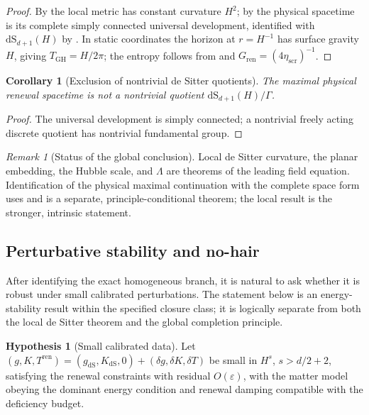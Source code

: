 \documentclass[11pt]{article}
\newtheorem{corollary}[theorem]{Corollary}
\theoremstyle{definition}
\newtheorem{hypothesis}[theorem]{Hypothesis}
\theoremstyle{remark}
\newtheorem{remark}[theorem]{Remark}
\newcommand{\eps}{\varepsilon}
\newcommand{\dS}{\mathrm{dS}}
\newcommand{\Tren}{T^{\mathrm{ren}}}
\newcommand{\GH}{\mathrm{GH}}
\newcommand{\etaScr}{\eta_{\mathrm{scr}}}
\newcommand{\Gren}{G_{\mathrm{ren}}}
\begin{document}
\begin{proof}
By  the local metric has constant
curvature $H^2$; by  the physical
spacetime is its complete simply connected universal development, identified with
$\dS_{d+1}(H)$ by .  In static coordinates the
horizon at $r=H^{-1}$ has surface gravity $H$, giving $T_{\GH}=H/2\pi$; the entropy
follows from  and $\Gren=(4\etaScr)^{-1}$.
\end{proof}

\begin{corollary}[Exclusion of nontrivial de Sitter quotients]
\label{cor:exclude-desitter-quotients}
The maximal physical renewal spacetime is not a nontrivial quotient
$\dS_{d+1}(H)/\Gamma$.
\end{corollary}

\begin{proof}
The universal development is simply connected; a nontrivial freely acting discrete
quotient has nontrivial fundamental group.
\end{proof}

\begin{remark}[Status of the global conclusion]
\label{rem:global-desitter-status}
Local de Sitter curvature, the planar embedding, the Hubble scale, and $\Lambda$
are theorems of the leading field equation.  Identification of the physical
maximal continuation with the complete space form uses
 and is a separate, principle-conditional
theorem; the local result is the stronger, intrinsic statement.
\end{remark}

\subsection{Perturbative stability and no-hair}

After identifying the exact homogeneous branch, it is natural to ask whether it
is robust under small calibrated perturbations.  The statement below is an
energy-stability result within the specified closure class; it is logically
separate from both the local de Sitter theorem and the global completion
principle.

\begin{hypothesis}[Small calibrated data]
\label{hyp:small-data}
Let $(g,K,\Tren)=(g_{\dS},K_{\dS},0)+(\delta g,\delta K,\delta T)$ be small in
$H^s$, $s>d/2+2$, satisfying the renewal constraints with residual $O(\eps)$, with
the matter model obeying the dominant energy condition and renewal damping
compatible with the deficiency budget.
\end{hypothesis}
\end{document}
